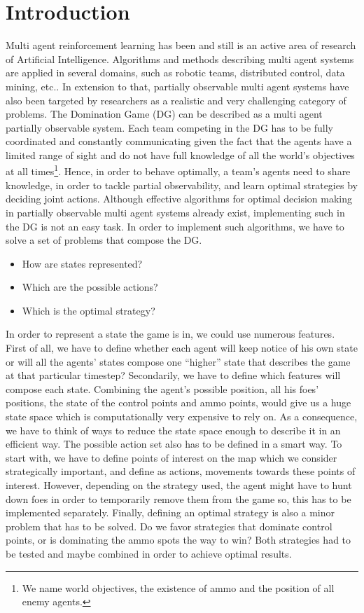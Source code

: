 \documentclass[conference]{IEEEtran}
\begin{document}
\section{Introduction}
Multi agent reinforcement learning has been and still is an active area of research of Artificial Intelligence. Algorithms and methods describing multi agent systems are applied in several domains, such as robotic teams, distributed control, data mining, etc.\cite{MARL}. In extension to that, partially observable multi agent systems have also been targeted by researchers as a realistic and very challenging category of problems. 
	The Domination Game (DG) can be described as a multi agent partially observable system. Each team competing in the DG has to be fully coordinated and constantly communicating given the fact that the agents have a limited range of sight and do not have full knowledge of all the world’s objectives at all times\footnote{We name world objectives, the existence of ammo and the position of all enemy agents.}. Hence, in order to behave optimally, a team’s agents need to share knowledge, in order to tackle partial observability, and learn optimal strategies by deciding joint actions. 
	Although effective algorithms for optimal decision making in partially observable multi agent systems already exist, implementing such in the DG is not an easy task. In order to implement such algorithms, we have to solve a set of problems that compose the DG.
\begin{itemize}

\item How are states represented?
\item Which are the possible actions? 
\item Which is the optimal strategy?

\end{itemize}	
	In order to represent a state the game is in, we could use numerous features. First of all, we have to define whether each agent will keep notice of his own state or will all the agents’ states compose one “higher” state that describes the game at that particular timestep? Secondarily, we have to define which features will compose each state. Combining the agent’s possible position, all his foes’ positions, the state of the control points and ammo points, would give us a huge state space which is computationally very expensive to rely on. As a consequence, we have to think of ways to reduce the state space enough to describe it in an efficient way.
	The possible action set also has to be defined in a smart way. To start with, we have to define points of interest on the map which we consider strategically important, and define as actions, movements towards these points of interest. However, depending on the strategy used, the agent might have to hunt down foes in order to temporarily remove them from the game so, this has to be implemented separately.
	Finally, defining an optimal strategy is also a minor problem that has to be solved. Do we favor strategies that dominate control points, or is dominating the ammo spots the way to win? Both strategies had to be tested and maybe combined in order to achieve optimal results.
\end{document}
